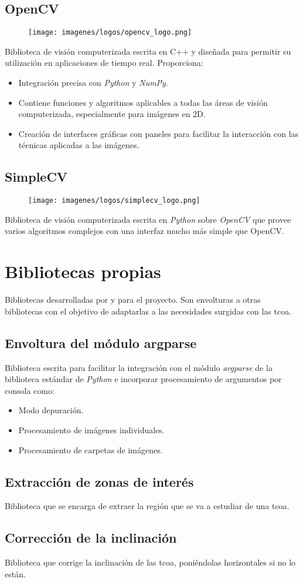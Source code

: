 \subsection{OpenCV}
\begin{figure}[H]
  \hspace*{1.4cm}
  \texttt{[image: imagenes/logos/opencv\_logo.png]}
\end{figure}
Biblioteca de visión computerizada escrita en C++ y diseñada para
permitir su utilización en aplicaciones de tiempo real. Proporciona:
\begin{itemize}
\item Integración precisa con \emph{Python} y \emph{NumPy}.
\item Contiene funciones y algoritmos aplicables a todas las áreas de
  visión computerizada, especialmente para imágenes en 2D.
\item Creación de interfaces gráficas con paneles para facilitar la
  interacción con las técnicas aplicadas a las imágenes.
\end{itemize}

\subsection{SimpleCV}
\begin{figure}[H]
  \hspace*{1.7cm}
  \texttt{[image: imagenes/logos/simplecv\_logo.png]}
\end{figure}
Biblioteca de visión computerizada escrita en \emph{Python} sobre
\emph{OpenCV} que provee varios algoritmos complejos con una interfaz
mucho más simple que OpenCV\@.

\section{Bibliotecas propias}

Bibliotecas desarrolladas por y para el proyecto. Son envolturas a
otras bibliotecas con el objetivo de adaptarlas a las necesidades
surgidas con las \gls{tcoa}.

\subsection{Envoltura del módulo argparse}
Biblioteca escrita para facilitar la integración con el módulo
\emph{argparse} de la biblioteca estándar de \emph{Python} e
incorporar procesamiento de argumentos por consola como:
\begin{itemize}
\item Modo depuración.
\item Procesamiento de imágenes individuales.
\item Procesamiento de carpetas de imágenes.
\end{itemize}

\subsection{Extracción de zonas de interés}
Biblioteca que se encarga de extraer la región que se va a estudiar de
una \gls{tcoa}.

\subsection{Corrección de la inclinación}
Biblioteca que corrige la inclinación de las \gls{tcoa}, poniéndolas
horizontales si no lo están.
